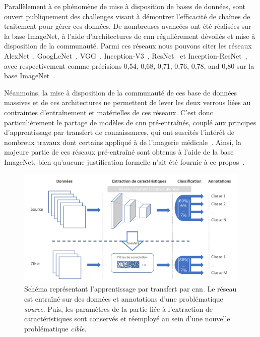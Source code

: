 Parallèlement à ce phénomène de mise à disposition de bases de données, sont ouvert publiquement des challenges visant à démontrer l'efficacité de chaînes de traitement pour gérer ces données. De nombreuses avancées ont été réalisées sur la base ImageNet, à l'aide d'architectures de \gls{cnn} régulièrement dévoilés et mise à disposition de la communauté. Parmi ces réseaux nous pouvons citer les réseaux AlexNet~\cite{Krizhevsky2012}, GoogLeNet~\cite{Szegedy2015}, VGG~\cite{Simonyan2014}, Inception-V3~\cite{Szegedy2016}, ResNet~\cite{He2016} et Inception-ResNet~\cite{Szegedy2017}, avec respectivement comme précisions 0,54, 0,68, 0,71, 0,76, 0,78, and 0,80 sur la base ImageNet~\cite{Canziani2016}.\par

Néanmoins, la mise à disposition de la communauté de ces base de données massives et de ces architectures ne permettent de lever les deux verrous liées au contraintes d'entraînement et matérielles de ces réseaux. C'est donc particulièrement le partage de modèles de \gls{cnn} pré-entraînés, couplé aux principes d'apprentissage par transfert de connaissances, qui ont suscités l'intérêt de nombreux travaux dont certains appliqué à de l'imagerie médicale~\cite{Litjens2017}. Ainsi, la majeure partie de ces réseaux pré-entraîné sont obtenus à l'aide de la base ImageNet, bien qu'aucune justification formelle n'ait été fournie à ce propos~\cite{Huh2016}.\par
 
\begin{figure}[H]
    \centering
    \includegraphics[width=\linewidth]{contents/chapter_4/resources/scheme_transfer_learning.pdf}
    \caption{Schéma représentant l'apprentissage par transfert par \gls{cnn}. Le réseau est entraîné sur des données et annotations d'une problématique \textit{source}. Puis, les paramètres de la partie liée à l'extraction de caractéristiques sont conservés et réemployé au sein d'une nouvelle problématique \textit{cible}.}
    \label{fig:scheme_transfer_learning}
\end{figure}\par

